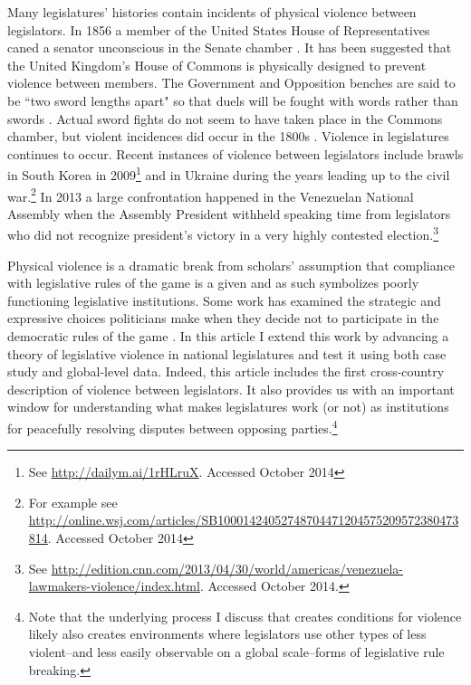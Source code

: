 \documentclass[a4paper]{article}\usepackage[]{graphicx}\usepackage[]{color}
\begin{document}
Many legislatures' histories contain incidents of physical violence between legislators. In 1856 a member of the United States House of Representatives caned a senator unconscious in the Senate chamber \citep{USSenateCanning}. It has been suggested that the United Kingdom's House of Commons is physically designed to prevent violence between members. The Government and Opposition benches are said to be ``two sword lengths apart" \citep{ParliamentUKSword} so that duels will be fought with words rather than swords \cite[220]{Schwarzmantel2010}. Actual sword fights do not seem to have taken place in the Commons chamber, but violent incidences did occur in the 1800s \citep[]{ByrneViolence}. Violence in legislatures continues to occur. Recent instances of violence between legislators include brawls in South Korea in 2009\footnote{See \url{http://dailym.ai/1rHLruX}. Accessed October 2014} and in Ukraine during the years leading up to the civil war.\footnote{For example see \url{http://online.wsj.com/articles/SB10001424052748704471204575209572380473814}. Accessed October 2014} In 2013 a large confrontation happened in the Venezuelan National Assembly when the Assembly President withheld speaking time from legislators who did not recognize president's victory in a very highly contested election.\footnote{See \url{http://edition.cnn.com/2013/04/30/world/americas/venezuela-lawmakers-violence/index.html}. Accessed October 2014.}

Physical violence is a dramatic break from scholars' assumption that compliance with legislative rules of the game is a given and as such symbolizes poorly functioning legislative institutions. Some work has examined the strategic and expressive choices politicians make when they decide not to participate in the democratic rules of the game \citep{wilkinson2006,Beaulieu2008,BeaulieuForthcoming}. In this article I extend this work by advancing a theory of legislative violence in  national legislatures and test it using both case study and global-level data. Indeed, this article includes the first cross-country description of violence between legislators. It also provides us with an important window for understanding what makes legislatures work (or not) as institutions for peacefully resolving disputes between opposing parties.\footnote{Note that the underlying process I discuss that creates conditions for violence likely also creates environments where legislators use other types of less violent--and less easily observable on a global scale--forms of legislative rule breaking.}
\end{document}
